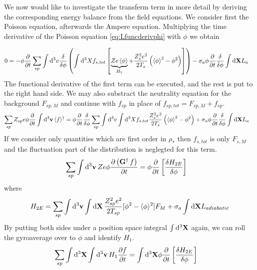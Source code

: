 We now would like to investigate the transferm term in more detail by deriving the corresponding energy balance from the field equations.
We consider first the Poisson equation, afterwards the Ampere equation.
Multiplying the time derivative of the Poisson equation \eqref{eq:Lfuncderivphi} with $\phi$ we obtain 

\begin{align}
0 &= - \phi \frac{\partial }{\partial t}\sum_{sp}\int\mathrm{d}^3v 
\frac{\delta}{\delta\phi}
\left(\int\mathrm{d}^3X f_{s,tot}
    \left[\underbrace{Ze\left\langle \phi\right\rangle}_{H_1} + \frac{Z_s^2e^2}{2T_s}\left(\left\langle \phi\right\rangle^2 - \phi^2\right)\right]
 \right)
 - \sigma_a\phi \frac{\partial }{\partial t}\frac{\delta}{\delta\phi} \int \mathrm{d}\mathbf{X} L_a
\end{align}
The functional derivative of the first term can be executed, and the rest is put to the right hand side.
We may also substract the neutrality equation for the background $F_{sp,M}$ and continue with $f_{sp}$ in place of $f_{sp,tot} = F_{sp,M} + f_{sp}$.
\begin{align}
\sum_{sp} Z_{sp} e \phi \frac{\partial }{\partial t} \int {\rm d}^3 {\bf v} \, \langle f \rangle^\dagger 
&=
\phi \frac{\partial }{\partial t}\frac{\delta}{\delta\phi}\sum_{sp}\int\mathrm{d}^3v \int\mathrm{d}^3X f_{s,tot}\frac{Z_s^2e^2}{2T_s}\left(\left\langle \phi\right\rangle^2 - \phi^2\right)
+
\sigma_a\phi \frac{\partial }{\partial t}\frac{\delta}{\delta\phi} \int \mathrm{d}\mathbf{X} L_a
\end{align}
If we consider only quantities which are first order in $\rho_*$ then $f_{s,tot}$ is only $F_{s,M}$ and the fluctuation part of the distribution is neglegted for this term.
\begin{align}
 \sum_{sp}\int {\rm d}^3 {\bf v} \, Ze\phi \frac{\partial \left(\mathbf{G}^\dagger\, f\right)}{\partial t} 
&=  \phi \frac{\partial }{\partial  t} \left [ \frac{\delta H_{2E}}{\delta \phi} \right ] 
\end{align} 
where 
\begin{equation} 
H_{2E} = \sum_{sp}\int {\rm d}^3 {\bf v} \int\mathrm{d}\mathbf{X}\, \frac{Z_{sp}^2 e^2}{2 T_{sp} } [ \phi^2 - \langle \phi \rangle^2 ] F_M + \sigma_a \int\mathrm{d}\mathbf{X}L_{adiabatic} 
\end{equation} 
By putting both sides under a position space integral $\int\mathrm{d}^3\mathbf{X}$ again, we can roll the gyroaverage over to $\phi$ and identify $H_1$.
\begin{align}
 \sum_{sp} \int {\rm d}^3 {\bf X} \int {\rm d}^3 {\bf v} \, H_1 \frac{\partial  f}{\partial  t} 
&=\int{\rm d}^3 {\bf X} \phi \frac{\partial }{\partial  t} \left [ \frac{\delta H_{2E}}{\delta \phi} \right ] 
\end{align}
